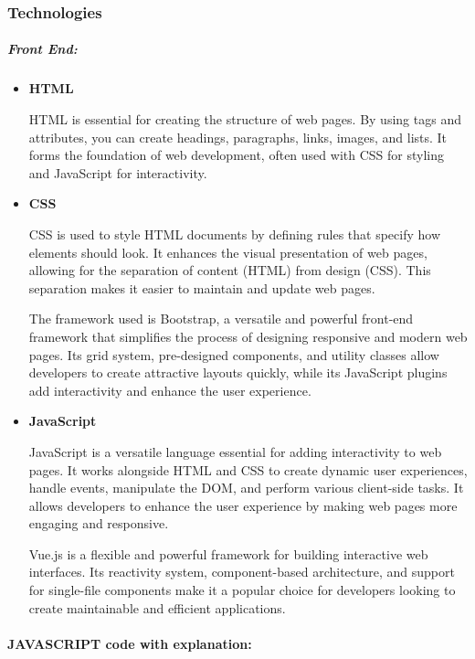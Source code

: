  \subsubsection{Technologies}
 
\subparagraph{Front End:}
\begin{itemize}
    \item \textbf{HTML}
    
    HTML is essential for creating the structure of web pages. By using tags and attributes, you can create headings, paragraphs, links, images, and lists. It forms the foundation of web development, often used with CSS for styling and JavaScript for interactivity.
    
    \item \textbf{CSS}
    
    CSS is used to style HTML documents by defining rules that specify how elements should look. It enhances the visual presentation of web pages, allowing for the separation of content (HTML) from design (CSS). This separation makes it easier to maintain and update web pages.

    The framework used is Bootstrap, a versatile and powerful front-end framework that simplifies the process of designing responsive and modern web pages. Its grid system, pre-designed components, and utility classes allow developers to create attractive layouts quickly, while its JavaScript plugins add interactivity and enhance the user experience.
    
    \item \textbf{JavaScript}
    
    JavaScript is a versatile language essential for adding interactivity to web pages. It works alongside HTML and CSS to create dynamic user experiences, handle events, manipulate the DOM, and perform various client-side tasks. It allows developers to enhance the user experience by making web pages more engaging and responsive.

    Vue.js is a flexible and powerful framework for building interactive web interfaces. Its reactivity system, component-based architecture, and support for single-file components make it a popular choice for developers looking to create maintainable and efficient applications.
    
\end{itemize}

\paragraph{JAVASCRIPT code with explanation:}


